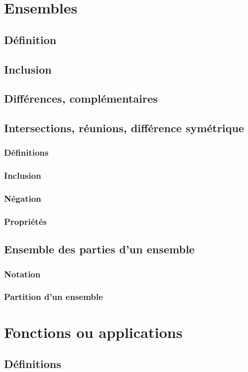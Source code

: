 \documentclass[12pt,a4paper,french]{book}
\begin{document}
	\section{Ensembles}
		\subsection{Définition}
		\subsection{Inclusion}
		\subsection{Différences, complémentaires}
		\subsection{Intersections, réunions, différence symétrique}
			\subsubsection{Définitions}
			\subsubsection{Inclusion}
			\subsubsection{Négation}
			\subsubsection{Propriétés}
		\subsection{Ensemble des parties d'un ensemble}
			\subsubsection{Notation}
			\subsubsection{Partition d'un ensemble}
	\section{Fonctions ou applications}
		\subsection{Définitions}
\end{document}
